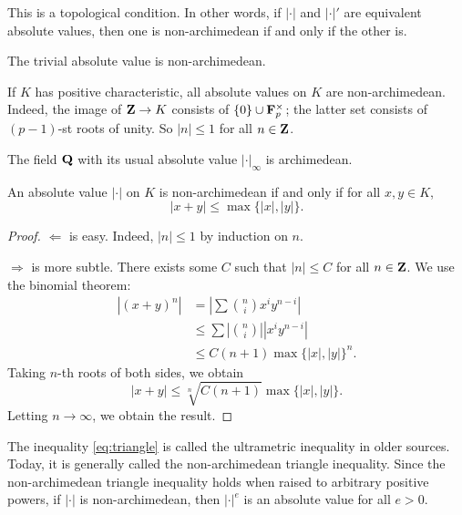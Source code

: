 This is a topological condition. In other words, if $|\cdot|$ and $|\cdot|'$ 
are equivalent absolute values, then one is non-archimedean if and only if the 
other is. 

\begin{example}
The trivial absolute value is non-archimedean. 
\end{example}

\begin{example}
If $K$ has positive characteristic, all absolute values on $K$ are 
non-archimedean. Indeed, the image of $\mathbf{Z}\to K$ consists of 
$\{0\}\cup \mathbf{F}_p^\times$; the latter set consists of $(p-1)$-st roots of 
unity. So $|n|\leqslant 1$ for all $n\in \mathbf{Z}$. 
\end{example}

\begin{example}
The field $\mathbf{Q}$ with its usual absolute value $|\cdot|_\infty$ is archimedean. 
\end{example}

\begin{theorem}
An absolute value $|\cdot|$ on $K$ is non-archimedean if and only if for all 
$x,y\in K$, 
\begin{equation}\label{eq:triangle}
  |x+y|\leqslant \max\{|x|,|y|\} .
\end{equation}
\end{theorem}
\begin{proof}
$\Leftarrow$ is easy. Indeed, $|n|\leqslant 1$ by induction on $n$. 

$\Rightarrow$ is more subtle. There exists some $C$ such that 
$|n|\leqslant C$ for all $n\in \mathbf{Z}$. We use the binomial theorem: 
\begin{align*}
  |(x+y)^n| 
    &= \left|\sum \binom n i x^i y^{n-i} \right| \\
    &\leqslant \sum \left|\binom n i \right| |x^i y^{n-i}| \\
    &\leqslant C(n+1)\max\{|x|,|y|\}^n .
\end{align*}
Taking $n$-th roots of both sides, we obtain 
\[
  |x+y|\leqslant \sqrt[n]{C(n+1)} \max\{|x|,|y|\} .
\]
Letting $n\to \infty$, we obtain the result. 
\end{proof}

The inequality \eqref{eq:triangle} is called the ultrametric inequality in 
older sources. Today, it is generally called the non-archimedean triangle 
inequality. Since the non-archimedean triangle inequality holds when raised to 
arbitrary positive powers, if $|\cdot|$ is non-archimedean, then 
$|\cdot|^e$ is an absolute value for all $e>0$. 

